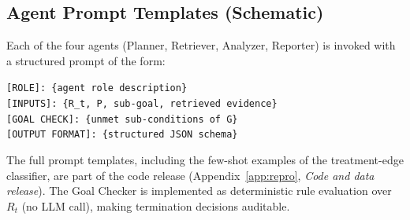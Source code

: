 \begin{table}[h]
\centering
\caption{ALERT goal-predicate and loop hyperparameters used throughout the evaluation.}
\label{tab:hyperparams}
\small
\setlength{\tabcolsep}{4pt}
\end{table}

\subsection{Agent Prompt Templates (Schematic)}

Each of the four agents (Planner, Retriever, Analyzer, Reporter) is invoked with a structured prompt of the form:
\begin{mycodebox}
\small\texttt{[ROLE]: \{agent role description\}}\\
\texttt{[INPUTS]: \{R\_t, P, sub-goal, retrieved evidence\}}\\
\texttt{[GOAL CHECK]: \{unmet sub-conditions of G\}}\\
\texttt{[OUTPUT FORMAT]: \{structured JSON schema\}}
\end{mycodebox}
The full prompt templates, including the few-shot examples of the treatment-edge classifier, are part of the code release (Appendix~\ref{app:repro}, \emph{Code and data release}). The Goal Checker is implemented as deterministic rule evaluation over $R_t$ (no LLM call), making termination decisions auditable.

